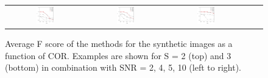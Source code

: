 \begin{figure}
\begin{tabular}{ccccc}
		\includegraphics[align=c,width=0.238\textwidth]{fig8f} &
		\includegraphics[align=c,width=0.238\textwidth]{fig8g} &
		\includegraphics[align=c,width=0.238\textwidth]{fig8h}
	\end{tabular}
	\caption{Average F score of the methods for the synthetic images as a function of COR. Examples are shown for S = 2 (top) and 3 (bottom) in combination with SNR = 2, 4, 5, 10 (left to right).\vspace{\baselineskip}}
	\label{fig8}
\end{figure}

